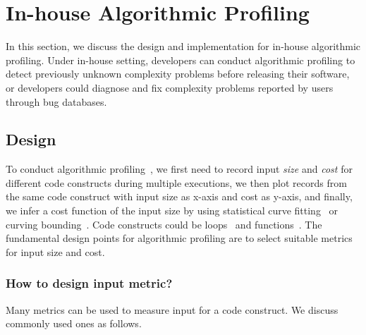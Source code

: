 \section{In-house Algorithmic Profiling}
\label{sec:inhouse}

In this section, we discuss the design and implementation for in-house algorithmic profiling.
Under in-house setting, 
developers can conduct algorithmic profiling 
to detect previously unknown complexity problems before releasing their software, 
or developers could diagnose and fix complexity problems 
reported by users through bug databases.


\subsection{Design}
To conduct algorithmic profiling~\cite{Aprof1,Aprof2,AlgoProf},
we first need to record input \textit{size} and \textit{cost} for different code constructs 
during multiple executions,
we then plot records from the same code construct with input size as x-axis and cost as y-axis, 
and finally, we infer a cost function of the input size by using 
statistical curve fitting~\cite{curve-fitting} 
or curving bounding~\cite{curve-bounding}. 
Code constructs could be loops~\cite{AlgoProf} and functions~\cite{Aprof1,Aprof2}. 
The fundamental design points for algorithmic 
profiling are to select suitable metrics for input size and cost. 



\subsubsection{How to design input metric?}
Many metrics can be used to measure input for a code construct. 
We discuss commonly used ones as follows.

